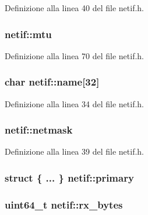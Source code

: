 Definizione alla linea 40 del file netif.\+h.

\hypertarget{structnetif_a2eb32b1acf0a223c5cc3874da3c2f3df}{
\subsubsection[{mtu}]{ netif\+::mtu}}\label{structnetif_a2eb32b1acf0a223c5cc3874da3c2f3df}


Definizione alla linea 70 del file netif.\+h.

\hypertarget{structnetif_ad113ca0a458623939eec5ce7fe2b6eef}{
\subsubsection[{name}]{\setlength{\rightskip}{0pt plus 5cm}char netif\+::name\mbox{[}32\mbox{]}}}\label{structnetif_ad113ca0a458623939eec5ce7fe2b6eef}


Definizione alla linea 34 del file netif.\+h.

\hypertarget{structnetif_a36ef3cfb5f0403df355dc6db0ddc2426}{
\subsubsection[{netmask}]{ netif\+::netmask}}\label{structnetif_a36ef3cfb5f0403df355dc6db0ddc2426}


Definizione alla linea 39 del file netif.\+h.

\hypertarget{structnetif_a367e7d85725497d7703bfc0424f472cf}{
\subsubsection[{primary}]{\setlength{\rightskip}{0pt plus 5cm}struct \{ ... \}   netif\+::primary}}\label{structnetif_a367e7d85725497d7703bfc0424f472cf}
\hypertarget{structnetif_a5a078449e22bb6f4d3d0068345d8dabc}{
\subsubsection[{rx\+\_\+bytes}]{\setlength{\rightskip}{0pt plus 5cm}uint64\+\_\+t netif\+::rx\+\_\+bytes}}\label{structnetif_a5a078449e22bb6f4d3d0068345d8dabc}


